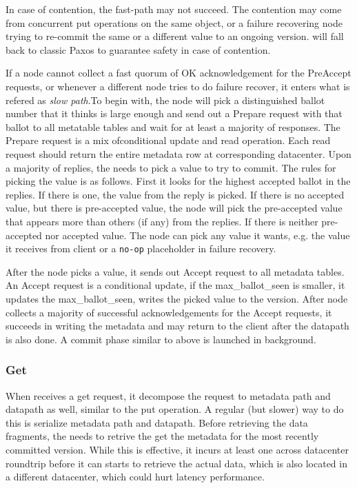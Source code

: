 In case of contention, the fast-path may not succeed. The contention may come from concurrent
{\name} put operations on the same object, or a failure recovering {\name} node trying to
re-commit the same or a different value to an ongoing version. {\name} will fall back to
classic Paxos to guarantee safety in case of contention.

If a {\name} node cannot collect a fast quorum of OK acknowledgement for the PreAccept requests,
or whenever a different {\name} node tries to do failure recover, it enters what is refered
as \emph{slow path}.To begin with, the {\name} node will pick a distinguished ballot number
that it thinks is large enough and send out a Prepare request with that ballot to all metatable
tables and wait for at least a majority of responses. The Prepare request is a mix ofconditional
update and read operation. Each read request should return the entire metadata row at corresponding
datacenter. Upon a majority of replies, the {\name} needs to pick a value to try to commit.
The rules for picking the value is as follows. First it looks for the highest accepted ballot
in the replies. If there is one, the value from the reply is picked. If there is no accepted
value, but there is pre-accepted value, the {\name} node will pick the pre-accepted value
that appears more than others (if any) from the replies. If there is neither pre-accepted
nor accepted value. The {\name} node can pick any value it wants, e.g. the value it receives
from client or a \texttt{no-op} placeholder in failure recovery.

After the {\name} node picks a value, it sends out Accept request to all metadata tables.
An Accept request is a conditional update, if the max\_ballot\_seen is smaller, it updates
the max\_ballot\_seen, writes the picked value to the version. After {\name} node collects
a majority of successful acknowledgements for the Accept requests, it succeeds in writing
the metadata and may return to the client after the datapath is also done. A commit phase
similar to above is launched in background.

\subsubsection{Get}
When {\name} receives a get request, it decompose the request to metadata path and datapath
as well, similar to the put operation. A regular (but slower) way to do this is serialize
metadata path and datapath. Before retrieving the data fragments, the {\name} needs to
retrive the get the metadata for the most recently committed version. While this is effective,
it incurs at least one across datacenter roundtrip before it can starts to retrieve the
actual data, which is also located in a different datacenter, which could hurt latency
performance.

